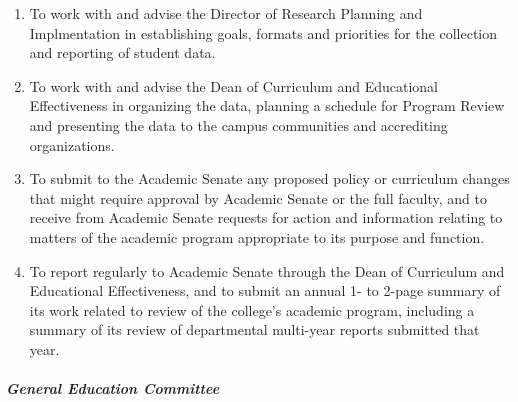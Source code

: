 \begin{enumerate}[label=\alph*)]
{\begin{enumerate}[label=\arabic*)]
{\begin{enumerate}[label=(\alph*)]
										\item{to provide the department with comments or suggestions to assist them in their preparation for the next review cycle;}
										\item{to encourage a campus conversation that establishes the value of a college-wide program review and addresses concerns as appropriate.}
									\end{enumerate}
								}
								\item{To work with and advise the Director of Research Planning and Implmentation in establishing goals, formats and priorities for the collection and reporting of student data.}
								\item{To work with and advise the Dean of Curriculum and Educational Effectiveness in organizing the data, planning a schedule for Program Review and presenting the data to the campus communities and accrediting organizations.}
								\item{To submit to the Academic Senate any proposed policy or curriculum changes that might require approval by Academic Senate or the full faculty, and to receive from Academic Senate requests for action and information relating to matters of the academic program appropriate to its purpose and function.}
								\item{To report regularly to Academic Senate through the Dean of Curriculum and Educational Effectiveness, and to submit an annual 1- to 2-page summary of its work related to review of the college's academic program, including a summary of its review of departmental multi-year reports submitted that year.}
							\end{enumerate}
						}
					\end{enumerate}
				\subparagraph{General Education Committee}
